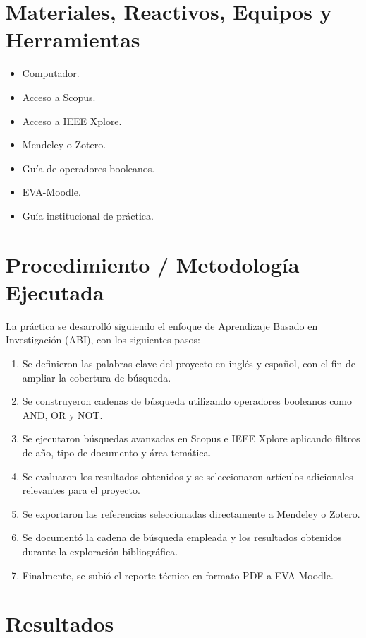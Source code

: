 \documentclass[11pt,a4paper]{article}
\begin{document}
\section{Materiales, Reactivos, Equipos y Herramientas}
\begin{itemize}[leftmargin=1.2cm]
    \item Computador.
    \item Acceso a Scopus.
    \item Acceso a IEEE Xplore.
    \item Mendeley o Zotero.
    \item Guía de operadores booleanos.
    \item EVA-Moodle.
    \item Guía institucional de práctica.
\end{itemize}

\section{Procedimiento / Metodología Ejecutada}
La práctica se desarrolló siguiendo el enfoque de Aprendizaje Basado en Investigación (ABI), con los siguientes pasos:

\begin{enumerate}[leftmargin=1.2cm]
    \item Se definieron las palabras clave del proyecto en inglés y español, con el fin de ampliar la cobertura de búsqueda.
    \item Se construyeron cadenas de búsqueda utilizando operadores booleanos como AND, OR y NOT.
    \item Se ejecutaron búsquedas avanzadas en Scopus e IEEE Xplore aplicando filtros de año, tipo de documento y área temática.
    \item Se evaluaron los resultados obtenidos y se seleccionaron artículos adicionales relevantes para el proyecto.
    \item Se exportaron las referencias seleccionadas directamente a Mendeley o Zotero.
    \item Se documentó la cadena de búsqueda empleada y los resultados obtenidos durante la exploración bibliográfica.
    \item Finalmente, se subió el reporte técnico en formato PDF a EVA-Moodle.
\end{enumerate}

\section{Resultados}\label{resultados}
\end{document}

